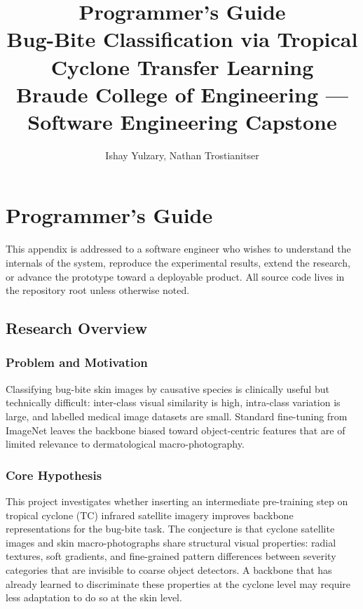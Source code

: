 \documentclass[12pt,a4paper]{article}
\begin{document}
\title{Programmer's Guide\\
       \large Bug-Bite Classification via Tropical Cyclone Transfer Learning\\
       Braude College of Engineering --- Software Engineering Capstone}
\author{Ishay Yulzary, Nathan Trostianitser}
\date{}
\maketitle
\tableofcontents
\newpage

\section{Programmer's Guide}
\label{app:programmer-guide}

This appendix is addressed to a software engineer who wishes to understand the
internals of the system, reproduce the experimental results, extend the research,
or advance the prototype toward a deployable product.
All source code lives in the repository root unless otherwise noted.

\subsection{Research Overview}
\label{sec:pg-overview}

\subsubsection{Problem and Motivation}

Classifying bug-bite skin images by causative species is clinically useful but
technically difficult: inter-class visual similarity is high, intra-class variation
is large, and labelled medical image datasets are small. Standard fine-tuning from
ImageNet leaves the backbone biased toward object-centric features that are of
limited relevance to dermatological macro-photography.

\subsubsection{Core Hypothesis}

This project investigates whether inserting an intermediate pre-training step on
tropical cyclone (TC) infrared satellite imagery improves backbone representations
for the bug-bite task. The conjecture is that cyclone satellite images and skin
macro-photographs share structural visual properties: radial textures, soft
gradients, and fine-grained pattern differences between severity categories that
are invisible to coarse object detectors. A backbone that has already learned to
discriminate these properties at the cyclone level may require less adaptation to
do so at the skin level.
\end{document}

